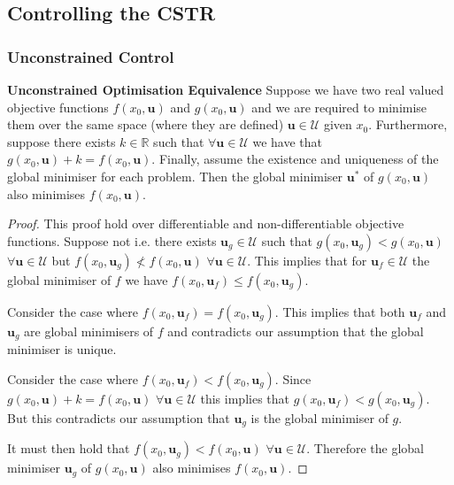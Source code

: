 \documentclass[../masters.tex]{subfiles}
\begin{document}
\subsection{Controlling the CSTR}

\subsubsection{Unconstrained Control}

\begin{thrm}
\textbf{Unconstrained Optimisation Equivalence} Suppose we have two real valued objective functions $f(x_0,\mathbf{u})$ and $g(x_0, \mathbf{u})$ and we are required to minimise them over the same space (where they are defined) $\mathbf{u}\in \mathcal{U}$ given $x_0$. Furthermore, suppose there exists $k\in \mathbb{R}$ such that $\forall \mathbf{u} \in \mathcal{U}$ we have that $g(x_0, \mathbf{u}) + k = f(x_0, \mathbf{u})$. Finally, assume the existence and uniqueness of the global minimiser for each problem. Then the global minimiser $\mathbf{u}^*$ of $g(x_0, \mathbf{u})$ also minimises $f(x_0, \mathbf{u})$.
\end{thrm}
\begin{proof}
This proof hold over differentiable and non-differentiable objective functions. Suppose not i.e. there exists  $\mathbf{u}_g \in \mathcal{U}$ such that $g(x_0, \mathbf{u}_g) < g(x_0, \mathbf{u})$ $\forall \mathbf{u} \in \mathcal{U}$ but $f(x_0, \mathbf{u}_g) \nless f(x_0, \mathbf{u})$ $\forall \mathbf{u} \in \mathcal{U}$. This implies that for $\mathbf{u}_f \in \mathcal{U}$ the global minimiser of $f$  we have $f(x_0, \mathbf{u}_f) \leq f(x_0, \mathbf{u}_g)$. 

Consider the case where $f(x_0, \mathbf{u}_f) = f(x_0, \mathbf{u}_g)$. This implies that both $\mathbf{u}_f$ and $\mathbf{u}_g$ are global minimisers of $f$ and contradicts our assumption that the global minimiser is unique.

Consider the case where $f(x_0, \mathbf{u}_f) < f(x_0, \mathbf{u}_g)$. Since $g(x_0, \mathbf{u}) + k = f(x_0, \mathbf{u})$ $\forall \mathbf{u} \in \mathcal{U}$ this implies that $g(x_0, \mathbf{u}_f) < g(x_0, \mathbf{u}_g)$. But this contradicts our assumption that $\mathbf{u}_g$ is the global minimiser of $g$.

It must then hold that $f(x_0, \mathbf{u}_g) < f(x_0, \mathbf{u})$ $\forall \mathbf{u} \in \mathcal{U}$. Therefore the global minimiser $\mathbf{u}_g$ of $g(x_0, \mathbf{u})$ also minimises $f(x_0, \mathbf{u})$. 
\end{proof}
\end{document}
